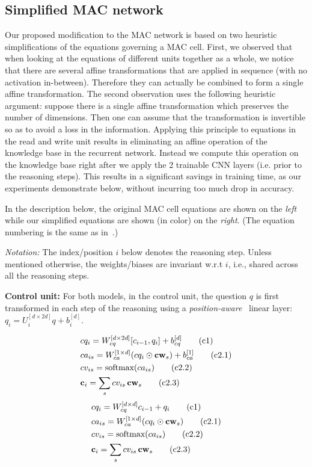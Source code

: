 \subsection{Simplified MAC network}
Our proposed modification to the MAC network is based on two heuristic
simplifications of the equations governing a MAC cell. 
First, we observed that when looking at the equations of different units
together as a whole, we notice that there are several affine transformations
that are applied in sequence (with no activation in-between).
Therefore they can actually be combined to form a single affine transformation.
The second observation uses the following heuristic argument:
suppose there is a single affine transformation which preserves the number
of dimensions. Then one can assume that the transformation is invertible
so as to avoid a loss in the information. Applying this principle to 
equations in the read and write unit results in eliminating an affine
operation of the knowledge base in the recurrent network. Instead we compute
this operation on the knowledge base right after we apply the 2 
trainable CNN layers (i.e. prior to the reasoning steps). This results
in a significant savings in training time, as our experiments demonstrate
below, without incurring too much drop in accuracy.

In the description below, the original MAC cell equations are shown on the \emph{left}
while our simplified equations are shown (in color) on the {\color{Plum} \emph{right}}.
(The equation numbering is the same as in~\cite{hudsonManning18}.)

\noindent\textit{Notation:} The index/position $i$ below denotes the reasoning step. 
Unless mentioned otherwise, the weights/biases are invariant w.r.t $i$, 
i.e., shared across all the reasoning steps. 

\noindent\textbf{Control unit:} 
For both models, in the control unit, the question $q$ is first transformed in each step of 
the reasoning using a \emph{position-aware}~\cite{hudsonManning18} 
linear layer: $q_i = U_i^{[d \times 2d]} q + b_i^{[d]}$.

\begin{multicols}{2}
	\noindent
	\begin{align*}
	&cq_i = W_{cq}^{[d \times 2d]} [c_{i-1}, q_i] + b_{cq}^{[d]}  \tag{c1} \\
	&ca_{is} = W_{ca}^{[1 \times d]} (cq_i \odot \mathbf{cw}_s) + b_{ca}^{[1]}
	\tag{c2.1}\\
	&cv_{is} = \textrm{softmax}(ca_{is}) \tag{c2.2}\\
	&\mathbf{c}_i = \sum_s cv_{is} \, \mathbf{cw}_s  \tag{c2.3}
	\end{align*}
	\columnbreak
	{\color{Plum}
	\begin{align*}
	&cq_i = W_{cq}^{[d \times d]} c_{i-1} + q_i  \tag{c1} \\
	&ca_{is} = W_{ca}^{[1 \times d]} (cq_i \odot \mathbf{cw}_s)  \tag{c2.1}\\
	&cv_{is} = \textrm{softmax}(ca_{is}) \tag{c2.2}\\
	&\mathbf{c}_i = \sum_s cv_{is} \, \mathbf{cw}_s  \tag{c2.3}
    \end{align*}}
\end{multicols}

